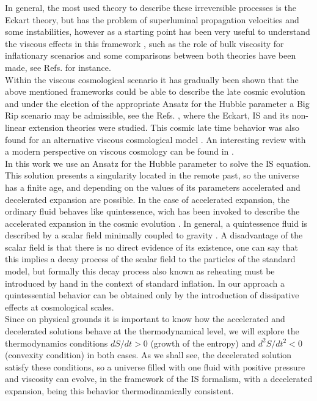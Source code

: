 \documentclass[twocolumn,showpacs,nofootinbib,floats,amsmath,amssymb]{revtex4}
\begin{document}
In general, the most used theory to describe these irreversible processes is the Eckart theory, \cite{eckart} but has the problem of superluminal propagation velocities and some instabilities, however as a starting point has been very useful to understand the viscous effects in this framework \cite{observations}, such as the role of bulk viscosity for inflationary scenarios \cite{chitre} and some comparisons between both theories have been made, see Refs. \cite{comparing, competencia} for instance.\\

Within the viscous cosmological scenario it has gradually been shown that the above mentioned frameworks could be able to describe the late cosmic evolution and under the election of the appropriate Ansatz for the Hubble parameter a Big Rip scenario may be admissible, see the Refs. \cite{Cataldo2005, CruzLepe, CCL}, where the Eckart, IS and its non-linear extension theories were studied. This cosmic late time behavior was also found for an alternative viscous cosmological model \cite{scherrer}. An interesting review with a modern perspective on viscous cosmology can be found in \cite{saridakis}.\\
 
In this work we use an Ansatz for the Hubble parameter to solve the IS equation. This solution presents a singularity located in the remote past, so the universe has a finite age, and depending on the values of its parameters accelerated and decelerated expansion are possible. In the case of accelerated expansion,  the ordinary fluid behaves like quintessence,  wich has been invoked to describe the accelerated expansion in the cosmic evolution \cite{wang0}. In general, a quintessence fluid is described  by a scalar
field minimally coupled to gravity \cite{starobinsky}. A disadvantage of the scalar field is that there
is no direct evidence of its existence, one can say that this implies a decay process of the scalar field to the particles of the standard model, but formally this decay process also known as reheating must be introduced by hand in the context of standard inflation. In our approach a quintessential behavior can be obtained only by the introduction of dissipative effects at cosmological scales.\\

Since on physical grounds it is important to know how the accelerated and decelerated solutions behave at the thermodynamical level, we will explore the thermodynamics conditions $dS/dt > 0$ (growth
of the entropy) and $d^{2}S/dt^{2} < 0$ (convexity condition) in both cases.  As we shall see, the decelerated solution satisfy these conditions, so a universe filled with one fluid with positive pressure and viscosity can evolve, in the framework of the IS formalism, with a decelerated expansion, being this behavior thermodinamically consistent.\\
 
\end{document}
